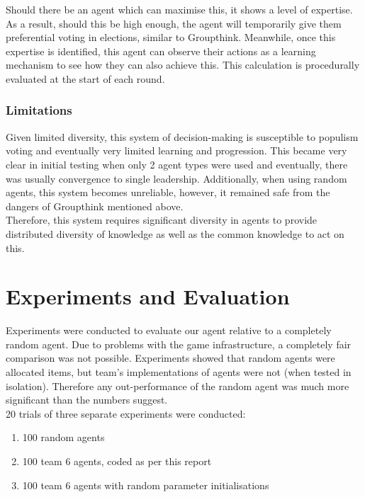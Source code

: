 Should there be an agent which can maximise this, it shows a level of expertise. As a result, should this be high enough, the agent will temporarily give them preferential voting in elections, similar to Groupthink. Meanwhile, once this expertise is identified, this agent can observe their actions as a learning mechanism to see how they can also achieve this. This calculation is procedurally evaluated at the start of each round.

\subsubsection{Limitations}

Given limited diversity, this system of decision-making is susceptible to populism voting and eventually very limited learning and progression. This became very clear in initial testing when only 2 agent types were used and eventually, there was usually convergence to single leadership. Additionally, when using random agents, this system becomes unreliable, however, it remained safe from the dangers of Groupthink mentioned above.\\

Therefore, this system requires significant diversity in agents to provide distributed diversity of knowledge as well as the common knowledge to act on this. 


\section{Experiments and Evaluation}

Experiments were conducted to evaluate our agent relative to a completely random agent. Due to problems with the game infrastructure, a completely fair comparison was not possible. Experiments showed that random agents were allocated items, but team's implementations of agents were not (when tested in isolation). Therefore any out-performance of the random agent was much more significant than the numbers suggest.\\

20 trials of three separate experiments were conducted:

\begin{enumerate}
    \item 100 random agents
    \item 100 team 6 agents, coded as per this report
    \item 100 team 6 agents with random parameter initialisations
\end{enumerate}

